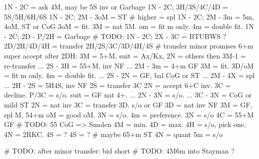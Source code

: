 1N -
2C = ask 4M, may be 5S inv or Garbage
    1N - 2C; 3H/3S/4C/4D = 5S/5H/6H/6S
    1N - 2C; 2M - 3oM = ST  # higher = spl
    1N - 2C; 2M - 3m = 5m, 4oM, ST or CoG
        3oM = fit. 3M = nat 5M. om = fit m only. 4m = double fit.
    1N - 2C; 2D - P/2H = Garbage
    # TODO: 1N - 2C; 2X - 3C = BTUBWS ?
2D/2H/4D/4H = transfer 2H/2S/3C/3D/4H/4S  # transfer minor promises 6+m
    super accept after 2DH: 3M = 5+M, suit = Ax/Kx, 2N = others
        then 3M-1 = re-transfer
    ... 2S - 3H = 55+M, inv NF
    ... 2M - 3m = 4+m GF
        3M = fit. 3D/oM = fit m only. 4m = double fit.
    ... 2S - 2N = GF, bal CoG or ST
    ... 2M - 4X = spl
    ... 2H - 2S = 5H4S, inv NF
2S = transfer 3C
    2N = accept 6+C inv. 3C = decline.
        P/3C = s/o. suit = GF nat 4+.
        ... 2N - 3N = s/o. ... 3C - 3N = CoG or mild ST
2N = nat inv
3C = transfer 3D. s/o or GF
3D = nat inv NF
3M = GF, spl M, 54+m
    oM = good oM. 3N = s/o. 4m = preference.
3N = s/o
4C = 55+M GF  # TODO: 55 CoG => Smolen
    4M = min.
    4D = max.
        4H = s/o, pick one. 4N = 2RKC. 4S = ?
4S = ?  # maybe 65+m ST
4N = quant
5m = s/o

# TODO: after minor transfer: bid short
# TODO: 4M6m into Stayman ?
